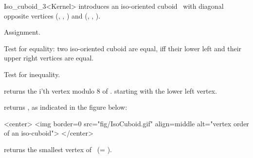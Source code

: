 \begin{ccRefClass} {Iso_cuboid_3<Kernel>}
            {introduces an iso-oriented cuboid \ccVar\ with diagonal
             opposite vertices 
             (, , ) and
             (, , ).  
             }


\ccOperations
\ccHidden {}
        {Assignment.}

       {Test for equality: two iso-oriented cuboid are equal, iff their
        lower left and their upper right vertices are equal.}

       {Test for inequality.}

       {returns the i'th vertex modulo 8  of \ccVar.
        starting with the lower left vertex.}

       {returns  , as indicated in the figure below:
       }

\begin{ccHtmlOnly}
<center>
<img border=0 src="fig/IsoCuboid.gif" align=middle alt="vertex order of
  an iso-cuboid">
</center>
\end{ccHtmlOnly} 


       {returns the smallest vertex of \ccVar\ (= ).}



\end{ccRefClass}
